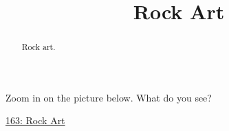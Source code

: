 \documentclass{ximera}
\title{Rock Art}
\begin{document}
\begin{abstract}
Rock art.
\end{abstract}
\maketitle



\begin{exploration}
Zoom in on the picture below. What do you see?
\begin{onlineOnly}
    \begin{center}
\end{center}
\end{onlineOnly}

\href{https://www.desmos.com/calculator/awoec8d6pq}{163: Rock Art}
\end{exploration}
\end{document}
